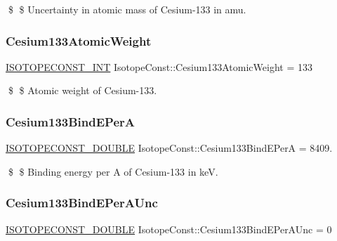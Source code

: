 \$ \$ Uncertainty in atomic mass of Cesium-\/133 in amu. \mbox{\label{group___isotope_const-_cesium-_cs133_ga2f0b5675b799982e2e2af94427a375ea}} 
\subsubsection{\texorpdfstring{Cesium133\+Atomic\+Weight}{Cesium133AtomicWeight}}
{\footnotesize\ttfamily \mbox{\hyperlink{group___isotope_const-_macros_ga5f18360b3e99483a35c32d789e62621c}{I\+S\+O\+T\+O\+P\+E\+C\+O\+N\+S\+T\+\_\+\+I\+NT}} Isotope\+Const\+::\+Cesium133\+Atomic\+Weight = 133}

\$ \$ Atomic weight of Cesium-\/133. \mbox{\label{group___isotope_const-_cesium-_cs133_ga3137b8cf3e13d4685f6774e536ed085b}} 
\subsubsection{\texorpdfstring{Cesium133\+Bind\+E\+PerA}{Cesium133BindEPerA}}
{\footnotesize\ttfamily \mbox{\hyperlink{group___isotope_const-_macros_ga8f45a7272ce02c0b4c65c44636ed719a}{I\+S\+O\+T\+O\+P\+E\+C\+O\+N\+S\+T\+\_\+\+D\+O\+U\+B\+LE}} Isotope\+Const\+::\+Cesium133\+Bind\+E\+PerA = 8409.}

\$ \$ Binding energy per A of Cesium-\/133 in keV. \mbox{\label{group___isotope_const-_cesium-_cs133_gaf174e1e683d1dafc6078f45c59cb69a0}} 
\subsubsection{\texorpdfstring{Cesium133\+Bind\+E\+Per\+A\+Unc}{Cesium133BindEPerAUnc}}
{\footnotesize\ttfamily \mbox{\hyperlink{group___isotope_const-_macros_ga8f45a7272ce02c0b4c65c44636ed719a}{I\+S\+O\+T\+O\+P\+E\+C\+O\+N\+S\+T\+\_\+\+D\+O\+U\+B\+LE}} Isotope\+Const\+::\+Cesium133\+Bind\+E\+Per\+A\+Unc = 0}

